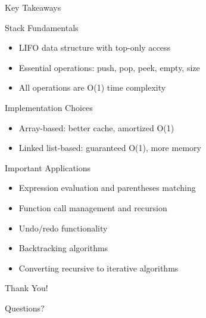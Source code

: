 \documentclass[aspectratio=169,xcolor=dvipsnames]{beamer}
\begin{document}
\begin{frame}{Key Takeaways}
  \begin{block}{Stack Fundamentals}
    \begin{itemize}
      \item LIFO data structure with top-only access
      \item Essential operations: push, pop, peek, empty, size
      \item All operations are O(1) time complexity
    \end{itemize}
  \end{block}
  
  \begin{block}{Implementation Choices}
    \begin{itemize}
      \item Array-based: better cache, amortized O(1)
      \item Linked list-based: guaranteed O(1), more memory
    \end{itemize}
  \end{block}
  
  \begin{block}{Important Applications}
    \begin{itemize}
      \item Expression evaluation and parentheses matching
      \item Function call management and recursion
      \item Undo/redo functionality
      \item Backtracking algorithms
      \item Converting recursive to iterative algorithms
    \end{itemize}
  \end{block}
\end{frame}

\begin{frame}[plain]
  \begin{center}
    {\Huge Thank You!}
    
    \vspace{1cm}
    
    {\large Questions?}
  \end{center}
\end{frame}
\end{document}
